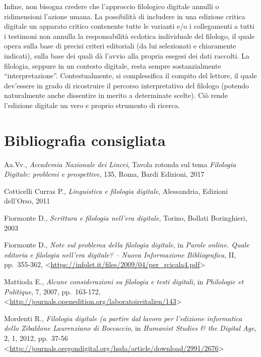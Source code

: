 \documentclass[
  b5paper,
  twoside,
  11pt,
  chapterprefix=false,
  bibliography=totocnumbered,
  listof=flat]{scrbook}
\begin{document}
Infine, non bisogna credere che l'approccio filologico digitale annulli
o ridimensioni l'azione umana. La possibilità di includere in una
edizione critica digitale un apparato critico contenente tutte le
varianti e/o i collegamenti a tutti i testimoni non annulla la
responsabilità ecdotica individuale del filologo, il quale opera sulla
base di precisi criteri editoriali (da lui selezionati e chiaramente
indicati), sulla base dei quali dà l'avvio alla propria esegesi dei dati
raccolti. La filologia, seppure in un contesto digitale, resta sempre
sostanzialmente \enquote{interpretazione}. Contestualmente, si complessifica il
compito del lettore, il quale dev'essere in grado di ricostruire il
percorso interpretativo del filologo (potendo naturalmente anche
dissentire in merito a determinate scelte). Ciò rende l'edizione
digitale un vero e proprio strumento di ricerca.

\hypertarget{bibliografia-consigliata-10}{%
\section*{Bibliografia consigliata}\label{bibliografia-consigliata-10}}

Aa.Vv., \emph{Accademia Nazionale dei Lincei}, Tavola rotonda sul tema
\emph{Filologia Digitale: problemi e prospettive}, 135, Roma, Bardi Edizioni,
2017

Cotticelli Curras P., \emph{Linguistica e filologia digitale}, Alessandria,
Edizioni dell'Orso, 2011

Fiormonte D., \emph{Scrittura e filologia nell'era digitale}, Torino, Bollati
Boringhieri, 2003

Fiormonte D., \emph{Note sul problema della filologia digitale}, in \emph{Parole
online. Quale editoria e filologia nell'era digitale? -- Nuova
Informazione Bibliografica}, II, pp.~355-362,
\textless{}\href{https://infolet.it/files/2009/04/per_rcicala4.pdf}{{https://infolet.it/files/2009/04/per\_rcicala4.pdf}}\textgreater{}

Mattioda E., \emph{Alcune considerazioni su filologia e testi digitali}, in
\emph{Philologie et Politique}, 7, 2007, pp.~163-172,
\textless{}{\url{http://journals.openedition.org/laboratoireitalien/143}\textgreater{}}

Mordenti R., \emph{Filologia digitale (a partire dal lavoro per l'edizione
informatica dello Zibaldone Laurenziano di Boccaccio}, in \emph{Humanist
Studies \& the Digital Age}, 2, 1, 2012, pp.~37-56
\textless{}\href{http://journals.oregondigital.org/hsda/article/download/2991/2676}{{http://journals.oregondigital.org/hsda/article/download/2991/2676}}\textgreater{}
\end{document}
